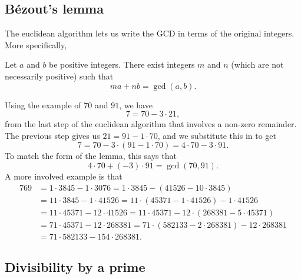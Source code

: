\subsection{B\'{e}zout's lemma}

The euclidean algorithm lets us write the GCD in terms of the original integers. More specifically,

\begin{lemma}[B\'{e}zout]
Let $a$ and $b$ be positive integers. There exist integers $m$ and $n$ (which are not necessarily positive) such that
\begin{equation*}
ma + nb = \gcd(a,b).
\end{equation*}
\end{lemma}
Using the example of $70$ and $91$, we have
\begin{equation*}
7 = 70 - 3\cdot 21,
\end{equation*}
from the last step of the euclidean algorithm that involves a non-zero remainder. The previous step gives us $21 = 91 - 1\cdot 70$, and we substitute this in to get
\begin{equation*}
7 = 70 - 3\cdot (91 - 1\cdot 70) = 4\cdot 70 - 3\cdot 91.
\end{equation*}
To match the form of the lemma, this says that
\begin{equation*}
4\cdot 70 + (-3)\cdot 91 = \gcd(70,91).
\end{equation*}
A more involved example is that
\begin{align*}
769 &= 1\cdot 3845 - 1\cdot 3076 = 1\cdot 3845 - (41526 - 10\cdot 3845) \\
&= 11\cdot 3845 - 1\cdot 41526 = 11\cdot (45371 - 1\cdot 41526) - 1\cdot 41526 \\
&= 11\cdot 45371 - 12\cdot 41526 = 11\cdot 45371 - 12\cdot (268381 - 5\cdot 45371) \\
&= 71\cdot 45371 - 12\cdot 268381 = 71\cdot (582133 - 2\cdot 268381) - 12\cdot 268381 \\
&= 71\cdot 582133 - 154\cdot 268381.
\end{align*}


\subsection{Divisibility by a prime}

